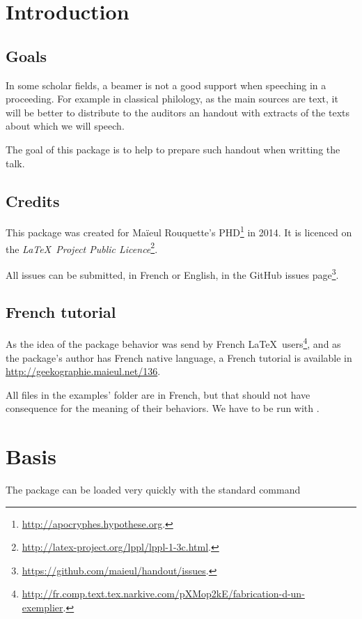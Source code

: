 \documentclass{ltxdockit}[2011/03/25]
\begin{document}
\printtitlepage
\tableofcontents

\section{Introduction}
\subsection{Goals}

In some scholar fields, a beamer is not a good support when speeching in a proceeding. For example in classical philology, as the main sources are text, it will be better to distribute to the auditors an handout with extracts of the texts about which we will speech.

The goal of this package is to help to prepare such handout when writting the talk.

\subsection{Credits}

This package was created for Maïeul Rouquette's PHD\footnote{\url{http://apocryphes.hypothese.org}.} in 2014. It is licenced on the \emph{\LaTeX\ Project Public Licence}\footnote{\url{http://latex-project.org/lppl/lppl-1-3c.html}.}.

All issues can be submitted, in French or English, in the GitHub issues page\footnote{\url{https://github.com/maieul/handout/issues}.}.

\subsection{French tutorial}

As the idea of the package behavior was send by French \LaTeX\ users\footnote{\url{http://fr.comp.text.tex.narkive.com/pXMop2kE/fabrication-d-un-exemplier}.}, and as the package's author has French native language, a French tutorial is available in \url{http://geekographie.maieul.net/136}. 

All files in the examples' folder are in French, but that should not have consequence for the meaning of their behaviors. We  have to be run with \XeLaTeX.


\section{Basis}

The package can be loaded very quickly with the standard command 
\end{document}
